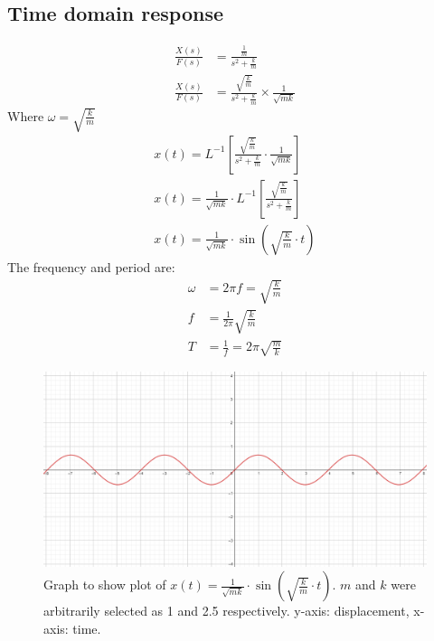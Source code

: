 \documentclass[12pt]{article}
\numberwithin{equation}{section}
\begin{document}
\subsection*{Time domain response}
\begin{align}
  \frac{X(s)}{F(s)} &= \frac{\frac{1}{m}}{s^2 + \frac{k}{m}}\\
  \frac{X(s)}{F(s)} &= \frac{\sqrt{\frac{k}{m}}}{s^2 + \frac{k}{m}} \times \frac{1}{\sqrt{mk}}
\end{align}
Where $\omega = \sqrt{\frac{k}{m}}$
\begin{align}
  x(t) = L^{-1} \left[ \frac{\sqrt{\frac{k}{m}}}{s^2 + \frac{k}{m}} \cdot \frac{1}{\sqrt{mk}} \right]\\
  x(t) = \frac{1}{\sqrt{mk}} \cdot L^{-1} \left[ \frac{\sqrt{\frac{k}{m}}}{s^2 + \frac{k}{m}} \right]\\
  x(t) = \frac{1}{\sqrt{mk}} \cdot \sin{\left(\sqrt{\frac{k}{m}}\cdot t\right)}
\end{align}
The frequency and period are:
\begin{align}
  \omega &= 2\pi f = \sqrt{\frac{k}{m}}\\
  f &= \frac{1}{2\pi}\sqrt{\frac{k}{m}}\\
  T &= \frac{1}{f} = 2\pi\sqrt{\frac{m}{k}}
\end{align}
\begin{figure}[H]
  \centering
  \includegraphics[width=\textwidth]{./img/3-1timeresponse.png}
  \caption{Graph to show plot of $x(t) = \frac{1}{\sqrt{mk}} \cdot \sin{\left(\sqrt{\frac{k}{m}}\cdot t\right)}$. $m$ and $k$ were arbitrarily selected as 1 and 2.5 respectively. y-axis: displacement, x-axis: time.}
\end{figure}
\end{document}
